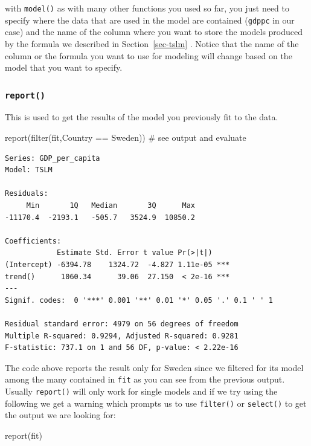 \documentclass[
  letterpaper,
  DIV=11,
  numbers=noendperiod]{scrartcl}
\newenvironment{Shaded}{\begin{snugshade}}{\end{snugshade}}
\newcommand{\CommentTok}[1]{\textcolor[rgb]{0.37,0.37,0.37}{#1}}
\newcommand{\FunctionTok}[1]{\textcolor[rgb]{0.28,0.35,0.67}{#1}}
\newcommand{\NormalTok}[1]{\textcolor[rgb]{0.00,0.23,0.31}{#1}}
\newcommand{\SpecialCharTok}[1]{\textcolor[rgb]{0.37,0.37,0.37}{#1}}
\newcommand{\StringTok}[1]{\textcolor[rgb]{0.13,0.47,0.30}{#1}}
\begin{document}
with \texttt{model()} as with many other functions you used so far, you
just need to specify where the data that are used in the model are
contained (\texttt{gdppc} in our case) and the name of the column where
you want to store the models produced by the formula we described in
Section~\ref{sec-tslm} . Notice that the name of the column or the
formula you want to use for modeling will change based on the model that
you want to specify.

\subsubsection{\texorpdfstring{\texttt{report()}}{report()}}\label{report}

This is used to get the results of the model you previously fit to the
data.

\begin{Shaded}
\begin{Highlighting}[]
\FunctionTok{report}\NormalTok{(}\FunctionTok{filter}\NormalTok{(fit,Country }\SpecialCharTok{==} \StringTok{\textquotesingle{}Sweden\textquotesingle{}}\NormalTok{)) }\CommentTok{\# see output and evaluate}
\end{Highlighting}
\end{Shaded}

\begin{verbatim}
Series: GDP_per_capita 
Model: TSLM 

Residuals:
     Min       1Q   Median       3Q      Max 
-11170.4  -2193.1   -505.7   3524.9  10850.2 

Coefficients:
            Estimate Std. Error t value Pr(>|t|)    
(Intercept) -6394.78    1324.72  -4.827 1.11e-05 ***
trend()      1060.34      39.06  27.150  < 2e-16 ***
---
Signif. codes:  0 '***' 0.001 '**' 0.01 '*' 0.05 '.' 0.1 ' ' 1

Residual standard error: 4979 on 56 degrees of freedom
Multiple R-squared: 0.9294, Adjusted R-squared: 0.9281
F-statistic: 737.1 on 1 and 56 DF, p-value: < 2.22e-16
\end{verbatim}

The code above reports the result only for Sweden since we filtered for
its model among the many contained in \texttt{fit} as you can see from
the previous output. Usually \texttt{report()} will only work for single
models and if we try using the following we get a warning which prompts
us to use \texttt{filter()} or \texttt{select()} to get the output we
are looking for:

\begin{Shaded}
\begin{Highlighting}[]
\FunctionTok{report}\NormalTok{(fit)}
\end{Highlighting}
\end{Shaded}
\end{document}
